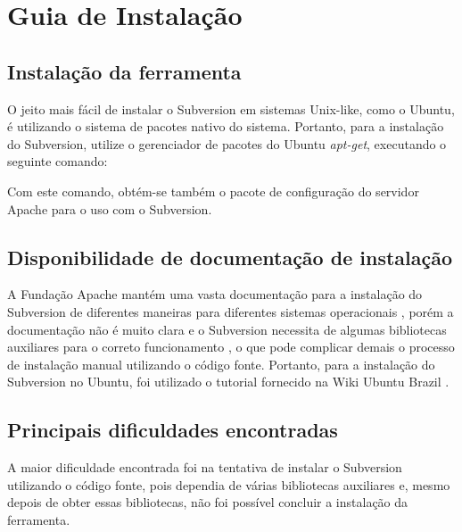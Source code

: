 \chapter[Guia de Instalação]{Guia de Instalação}

\section{Instalação da ferramenta}
    
    O jeito mais fácil de instalar o Subversion em sistemas Unix-like, como o Ubuntu,
    é utilizando o sistema de pacotes nativo do sistema. Portanto, para a instalação do Subversion,
    utilize o gerenciador de pacotes do Ubuntu \textit{apt-get}, executando o seguinte comando:
    
    \colorbox{Gray}{
      \begin{minipage}{0.6\linewidth}
      \end{minipage}
    }
    
    Com este comando, obtém-se também o pacote de configuração do servidor Apache para o uso com o Subversion.
  
\section{Disponibilidade de documentação de instalação}
  
  A Fundação Apache mantém uma vasta documentação para a instalação do Subversion de diferentes maneiras
  para diferentes sistemas operacionais \footnotemark, porém a documentação não é muito clara e o Subversion necessita
  de algumas bibliotecas auxiliares para o correto funcionamento \cite{svn-book}, o que pode complicar demais o processo
  de instalação manual utilizando o código fonte. Portanto, para a instalação do Subversion no Ubuntu, foi utilizado o
  tutorial fornecido na Wiki Ubuntu Brazil \footnotemark.
  
  
\section{Principais dificuldades encontradas}
  
  A maior dificuldade encontrada foi na tentativa de instalar o Subversion utilizando o código fonte, pois dependia de 
  várias bibliotecas auxiliares e, mesmo depois de obter essas bibliotecas, não foi possível concluir a instalação da
  ferramenta.